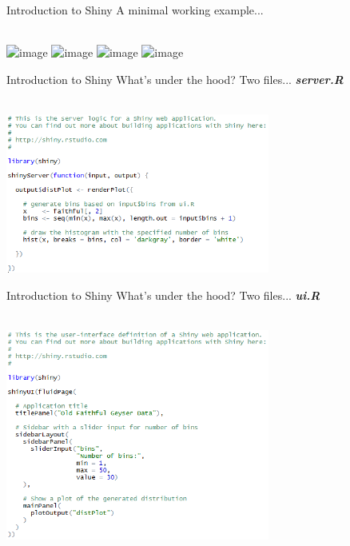 \documentclass[serif]{beamer}\usepackage[]{graphicx}\usepackage[]{color}
\newcommand{\emtxt}[1]{\textbf{\textit{#1}}}
\begin{document}
\begin{frame}{Introduction to Shiny}
A minimal working example...\\~\\
\begin{center}
\includegraphics<1>[width = 0.7\textwidth]{fig/mwe1.png}
\includegraphics<2>[width = 0.7\textwidth]{fig/mwe2.png}
\includegraphics<3>[width = 0.7\textwidth]{fig/mwe3.png}
\includegraphics<4>[width = 0.7\textwidth]{fig/mwe4.png}
\end{center}
\end{frame}

\begin{frame}[t]{Introduction to Shiny}
What's under the hood? Two files... \emtxt{server.R}\\~\\
\centerline{\includegraphics[width = 0.65\textwidth]{fig/serverex.png}}
\end{frame}

\begin{frame}[t]{Introduction to Shiny}
What's under the hood? Two files... \emtxt{ui.R}\\~\\
\centerline{\includegraphics[width = 0.65\textwidth]{fig/uiex.png}}
\end{frame}
\end{document}
